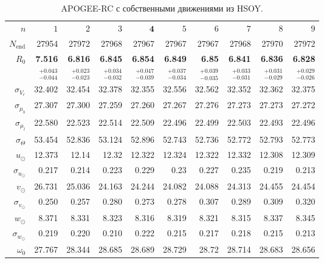 \documentclass{matmex-diploma-custom}
\begin{document}
\begin{table}[h!]
\centering
\caption{APOGEE-RC с собственными движениями из HSOY.}
\begin{tabular}{r|rrrrrrrrr}
\hline
$n$ & $1$ & $2$ & $3$ & $\textbf{4}$ & $5$&$ 6 $&$ 7 $&$ 8 $&$ 9 $\\
 $N_{\mathrm{end}}$ & 27954       &    27972 &    27968 &    27967 &   27967 &    27967 &    27968 &    27970 &    27972 \\
 $R_0 $&  \textbf{7.516}       &    \textbf{6.816} &    \textbf{6.845} &    \textbf{6.854} &   \textbf{6.849} &     \textbf{6.85} &    \textbf{6.841} &    \textbf{6.836} &    \textbf{6.828} \\
       & $_{-0.044}^{+0.043} $ & $_{-0.023}^{+0.023}$ & $_{-0.032}^{+0.034}$   & $_{-0.039}^{+0.047}$  & $_{-0.034}^{+0.037}$  & $_{-0.035}^{+0.039}$  & $_{-0.031}^{+0.033}$  & $_{-0.029}^{+0.031}$  & $_{-0.026}^{+0.029}$  \\\hline
 $\sigma_{V_r} $& 32.402      &  32.454 &  32.378 &  32.355 &  32.556 &  32.562 &  32.352 &  32.362 &  32.375  \\ 
 $\sigma_{\mu_b} $& 27.307      &  27.300 &  27.259 &  27.260 &  27.267 &  27.276 &  27.273 &  27.273 &  27.272  \\ 
 $\sigma_{\mu_l} $& 22.580      &  22.523 &  22.514 &  22.509 &  22.496 &  22.499 &  22.503 &  22.493 &  22.496  \\\hline 
 $\sigma_{\Theta} $& 53.454      &  52.836 &  53.124 &  52.896 &  52.743 &  52.736 &  52.772 &  52.793 &  52.773  \\\hline 
 $ u_{\odot} $& 12.373      &    12.14 &    12.32 &   12.322 &  12.324 &   12.322 &   12.332 &   12.308 &   12.309 \\
 $\sigma_{u_{\odot}} $&0.217       &    0.214 &    0.223 &    0.229 &    0.23 &    0.227 &    0.235 &    0.219 &    0.213 \\
 $v_{\odot} $& 26.731      &   25.036 &   24.163 &   24.244 &  24.082 &   24.088 &   24.313 &   24.455 &   24.454 \\
 $\sigma_{v_{\odot}}$&0.250       &    0.257 &     0.280 &    0.273 &   0.278 &    0.307 &    0.289 &    0.309 &     0.320 \\
 $w_{\odot} $& 8.371       &    8.331 &    8.323 &    8.316 &   8.319 &    8.321 &    8.315 &    8.337 &    8.345 \\
 $\sigma_{w_{\odot}}$&0.219       &     0.220 &     0.210 &    0.222 &   0.215 &    0.217 &    0.218 &    0.215 &    0.213 \\
 $\omega_0 $&27.767      &   28.344 &   28.685 &   28.689 &  28.729 &    28.72 &   28.714 &   28.683 &   28.656 \\

\end{tabular}
\end{table}
\end{document}
